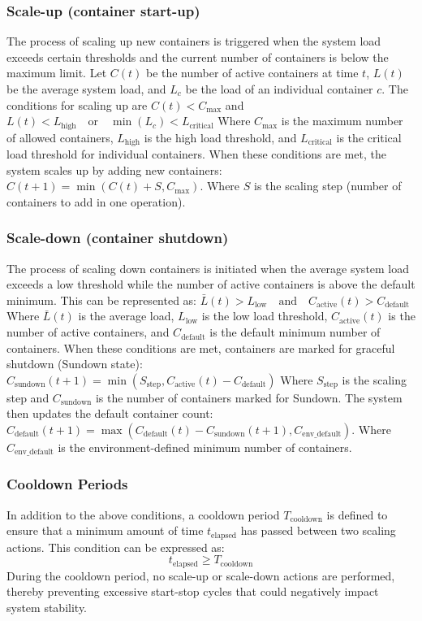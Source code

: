 \documentclass[twocolumn]{webofc}
\begin{document}
\subsubsection{Scale-up (container start-up)}
The process of scaling up new containers is triggered when the system load exceeds certain thresholds and the current number of containers is below the maximum limit. Let $C(t)$ be the number of active containers at time $t$, $L(t)$ be the average system load, and $L_c$ be the load of an individual container $c$. The conditions for scaling up are $C(t) < C_{\text{max}}$ and $L(t) < L_{\text{high}} \quad \text{or} \quad \min(L_c) < L_{\text{critical}}$ Where $C_{\text{max}}$ is the maximum number of allowed containers, $L_{\text{high}}$ is the high load threshold, and $L_{\text{critical}}$ is the critical load threshold for individual containers. When these conditions are met, the system scales up by adding new containers: $C(t+1) = \min(C(t) + S, C_{\text{max}})$. Where $S$ is the scaling step (number of containers to add in one operation).

\subsubsection{Scale-down (container shutdown)}
The process of scaling down containers is initiated when the average system load exceeds a low threshold while the number of active containers is above the default minimum. This can be represented as: $\bar{L}(t) > L_{\text{low}} \quad \text{and} \quad C_{\text{active}}(t) > C_{\text{default}}$ Where $\bar{L}(t)$ is the average load, $L_{\text{low}}$ is the low load threshold, $C_{\text{active}}(t)$ is the number of active containers, and $C_{\text{default}}$ is the default minimum number of containers. When these conditions are met, containers are marked for graceful shutdown (Sundown state): 
$C_{\text{sundown}}(t+1) = \min(S_{\text{step}}, C_{\text{active}}(t) - C_{\text{default}})$ Where $S_{\text{step}}$ is the scaling step and $C_{\text{sundown}}$ is the number of containers marked for Sundown. The system then updates the default container count: $C_{\text{default}}(t+1) = \max(C_{\text{default}}(t) - C_{\text{sundown}}(t+1), C_{\text{env\_default}})$. Where $C_{\text{env\_default}}$ is the environment-defined minimum number of containers.

\subsubsection{Cooldown Periods}
In addition to the above conditions, a cooldown period \( T_{\text{cooldown}} \) is defined to ensure that a minimum amount of time \( t_{\text{elapsed}} \) has passed between two scaling actions. This condition can be expressed as:
\[
    t_{\text{elapsed}} \geq T_{\text{cooldown}}
\]
During the cooldown period, no scale-up or scale-down actions are performed, thereby preventing excessive start-stop cycles that could negatively impact system stability.
\end{document}
